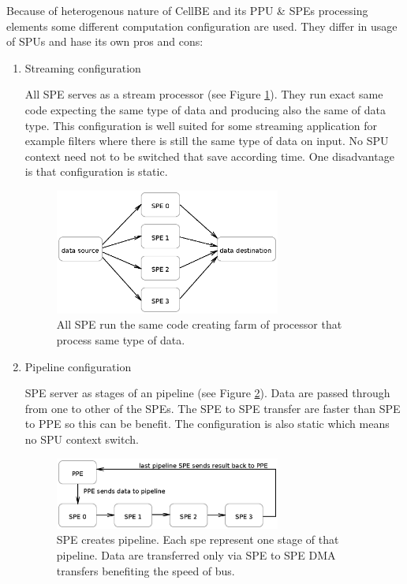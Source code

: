 \par
Because of heterogenous nature of CellBE and its PPU \& SPEs processing elements some different computation configuration are used.
 They differ in usage of SPUs and hase its own pros and cons:
\begin{enumerate}
\item Streaming configuration
\par
All SPE serves as a stream processor (see Figure \ref{fg:streamingModel}).
 They run exact same code expecting the same type of data and producing also the same of data type.
 This configuration is well suited for some streaming application for example filters where there is still the same type of data on input.
 No SPU context need not to be switched that save according time.
 One disadvantage is that configuration is static.

\begin{figure}
    \centering
    \includegraphics[width=0.7\textwidth]{data/streamingModel}
    \caption[Streaming SPE configuration]{All SPE run the same code creating farm of processor that process same type of data.}
    \label{fg:streamingModel}
\end{figure}

\item Pipeline configuration
\par
SPE server as stages of an pipeline (see Figure \ref{fg:pipelineModel}).
 Data are passed through from one to other of the SPEs.
 The SPE to SPE transfer are faster than SPE to PPE so this can be benefit.
 The configuration is also static which means no SPU context switch.

\begin{figure}
    \centering
    \includegraphics[width=0.7\textwidth]{data/pipelineModel}
    \caption[Pipeline SPE configuration]{SPE creates pipeline. Each spe represent one stage of that pipeline. Data are transferred only via SPE to SPE DMA transfers benefiting the speed of bus.}
    \label{fg:pipelineModel}
\end{figure}


\end{enumerate}
